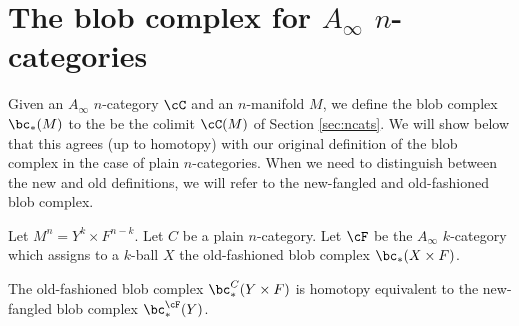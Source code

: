 
\section{The blob complex for $A_\infty$ $n$-categories}
\label{sec:ainfblob}

Given an $A_\infty$ $n$-category $\cC$ and an $n$-manifold $M$, we define the blob
complex $\bc_*(M)$ to the be the colimit $\cC(M)$ of Section \ref{sec:ncats}.
We will show below 
that this agrees (up to homotopy) with our original definition of the blob complex
in the case of plain $n$-categories.
When we need to distinguish between the new and old definitions, we will refer to the 
new-fangled and old-fashioned blob complex.

\medskip

Let $M^n = Y^k\times F^{n-k}$.  
Let $C$ be a plain $n$-category.
Let $\cF$ be the $A_\infty$ $k$-category which assigns to a $k$-ball
$X$ the old-fashioned blob complex $\bc_*(X\times F)$.

\begin{thm}
The old-fashioned blob complex $\bc_*^C(Y\times F)$ is homotopy equivalent to the
new-fangled blob complex $\bc_*^\cF(Y)$.
\end{thm}

